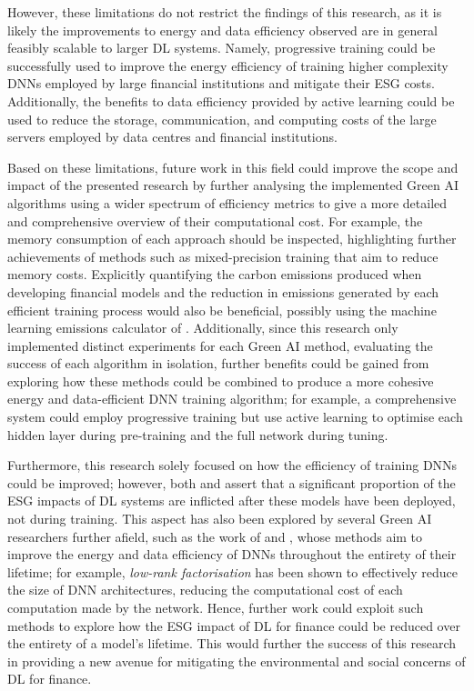 \documentclass[a4paper, 11pt]{report}
\begin{document}
    However, these limitations do not restrict the findings of this research, as it is likely the improvements to energy and data efficiency observed are in general feasibly scalable to larger DL systems. Namely, progressive training could be successfully used to improve the energy efficiency of training higher complexity DNNs employed by large financial institutions and mitigate their ESG costs. Additionally, the benefits to data efficiency provided by active learning could be used to reduce the storage, communication, and computing costs of the large servers employed by data centres and financial institutions.

    Based on these limitations, future work in this field could improve the scope and impact of the presented research by further analysing the implemented Green AI algorithms using a wider spectrum of efficiency metrics to give a more detailed and comprehensive overview of their computational cost. For example, the memory consumption of each approach should be inspected, highlighting further achievements of methods such as mixed-precision training that aim to reduce memory costs. Explicitly quantifying the carbon emissions produced when developing financial models and the reduction in emissions generated by each efficient training process would also be beneficial, possibly using the machine learning emissions calculator of \citet{lacoste-2019}. Additionally, since this research only implemented distinct experiments for each Green AI method, evaluating the success of each algorithm in isolation, further benefits could be gained from exploring how these methods could be combined to produce a more cohesive energy and data-efficient DNN training algorithm; for example, a comprehensive system could employ progressive training but use active learning to optimise each hidden layer during pre-training and the full network during tuning.

    Furthermore, this research solely focused on how the efficiency of training DNNs could be improved; however, both \citet{bender-2021} and \citet{xu-2021} assert that a significant proportion of the ESG impacts of DL systems are inflicted after these models have been deployed, not during training. This aspect has also been explored by several Green AI researchers further afield, such as the work of \citet{lacoste-2019} and \citet{cai-2022}, whose methods aim to improve the energy and data efficiency of DNNs throughout the entirety of their lifetime; for example, \emph{low-rank factorisation} \citep{xu-2021} has been shown to effectively reduce the size of DNN architectures, reducing the computational cost of each computation made by the network. Hence, further work could exploit such methods to explore how the ESG impact of DL for finance could be reduced over the entirety of a model's lifetime. This would further the success of this research in providing a new avenue for mitigating the environmental and social concerns of DL for finance.


    \newpage
    \footnotesize
    
\end{document}
